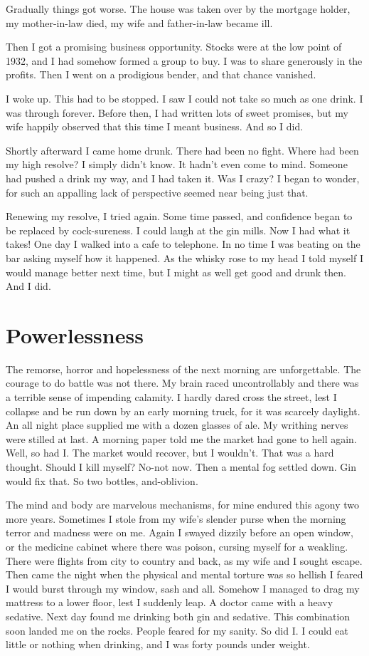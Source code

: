 Gradually things got worse.
The house was taken over by the mortgage holder, my mother-in-law died, my wife and father-in-law became ill.

Then I got a promising business opportunity.
Stocks were at the low point of 1932, and I had somehow formed a group to buy.
I was to share generously in the profits.
Then I went on a prodigious bender, and that chance vanished.

I woke up.
This had to be stopped. 
I saw I could not take so much as one drink.
I was through forever.
Before then, I had written lots of sweet promises, but my wife happily observed that this time I meant business.
And so I did.

Shortly afterward I came home drunk.
There had been no fight.
Where had been my high resolve?
I simply didn't know.
It hadn't even come to mind.
Someone had pushed a drink my way, and I had taken it.
Was I crazy?
I began to wonder, for such an appalling lack of perspective seemed near being just that.

Renewing my resolve, I tried again.
Some time passed, and confidence began to be replaced by cock-sureness.
I could laugh at the gin mills.
Now I had what it takes!
One day I walked into a cafe to telephone.
In no time I was beating on the bar asking myself how it happened.
As the whisky rose to my head I told myself I would manage better next time, but I might as well get good and drunk then.
And I did.


\section{Powerlessness}

The remorse, horror and hopelessness of the next morning are unforgettable.
The courage to do battle was not there.
My brain raced uncontrollably and there was a terrible sense of impending calamity.
I hardly dared cross the street, lest I collapse and be run down by an early morning truck, for it was scarcely daylight.
An all night place supplied me with a dozen glasses of ale.
My writhing nerves were stilled at last.
A morning paper told me the market had gone to hell again.
Well, so had I.
The market would recover, but I wouldn't.
That was a hard thought.
Should I kill myself?
No-not now.
Then a mental fog settled down.
Gin would fix that.
So two bottles, and-oblivion.

The mind and body are marvelous mechanisms, for mine endured this agony two more years.
Sometimes I stole from my wife's slender purse when the morning terror and madness were on me.
Again I swayed dizzily before an open window, or the medicine cabinet where there was poison, cursing myself for a weakling.
There were flights from city to country and back, as my wife and I sought escape.
Then came the night when the physical and mental torture was so hellish I feared I would burst through my window, sash and all.
Somehow I managed to drag my mattress to a lower floor, lest I suddenly leap.
A doctor came with a heavy sedative.
Next day found me drinking both gin and sedative.
This combination soon landed me on the rocks.
People feared for my sanity.
So did I.
I could eat little or nothing when drinking, and I was forty pounds under weight.


